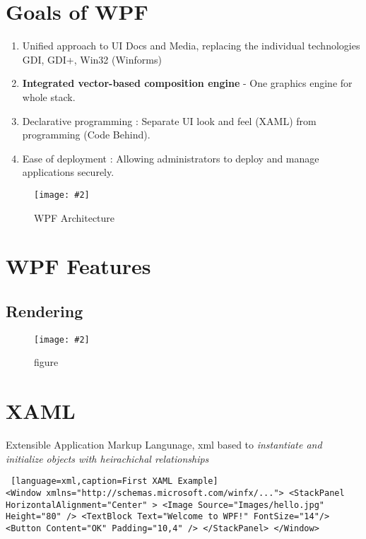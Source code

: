 \documentclass[a4paper,10pt]{scrreprt}
\newcommand{\pic}[2][figure]{\begin{figure}[h]
 \centering
 \texttt{[image: \#2]}
 \caption{#1}
\end{figure}
}
\begin{document}
\section{Goals of WPF}
\begin{enumerate}
\item Unified approach to UI Docs and Media, replacing the individual technologies GDI, GDI+, Win32 (Winforms)
\item \textbf{Integrated vector-based composition engine} - One graphics engine for whole stack.
\item Declarative programming : Separate UI look and feel (XAML) from programming (Code Behind).
\item Ease of deployment : Allowing administrators to deploy and manage applications securely.
\end{enumerate}

\pic[WPF Architecture]{wpfArchitecture.PNG}

\section{WPF Features}
\subsection{Rendering}
\pic{wrender.png}

\section{XAML}
Extensible Application Markup Langunage, xml based to \textit{instantiate and initialize objects with heirachichal relationships}

\begin{lstlisting} [language=xml,caption=First XAML Example]
<Window xmlns="http://schemas.microsoft.com/winfx/..."> <StackPanel HorizontalAlignment="Center" > <Image Source="Images/hello.jpg" Height="80" /> <TextBlock Text="Welcome to WPF!" FontSize="14"/> <Button Content="OK" Padding="10,4" /> </StackPanel> </Window>
\end{lstlisting}
\end{document}
